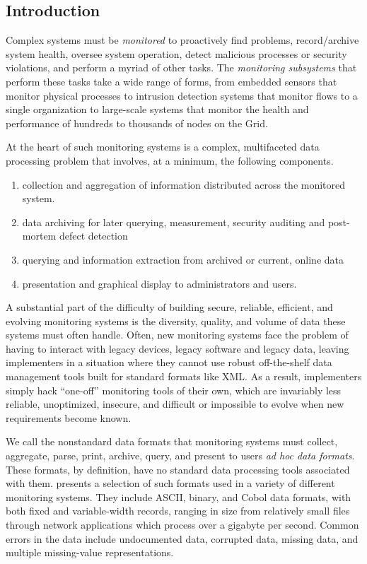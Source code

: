\subsection{Introduction}
\label{ssec:intro}

Complex systems must be {\em monitored} to proactively find problems,
record/archive system health, oversee system operation, detect
malicious processes or security violations, and perform a myriad of other tasks.
The {\em monitoring subsystems} 
that perform these tasks take a wide range of forms, 
from embedded sensors that monitor physical processes to
intrusion detection systems that monitor flows to a single
organization  
to large-scale systems
that monitor the health and performance of hundreds to thousands of nodes
on the Grid.

At the heart of such monitoring systems is a complex, multifaceted
data processing problem that involves, at a minimum, the following components.
\begin{enumerate}
\item collection and aggregation of information 
distributed across the monitored system.
\item data archiving for later querying, measurement, security auditing and 
post-mortem defect detection
\item querying and information extraction from archived or current, online data
\item presentation and graphical display to administrators and users.
\end{enumerate}

A substantial part of the difficulty of building secure, reliable, efficient,
and evolving monitoring systems is the diversity, quality, and volume of data
these systems must often handle.  Often, new monitoring
systems face the problem of having to interact with legacy devices,
legacy software and legacy data, leaving implementers in a situation
where they cannot use robust off-the-shelf data management tools built for
standard formats like XML.  As a result, implementers simply
hack ``one-off'' monitoring tools of their own, which are invariably
less reliable, unoptimized, insecure, and difficult or impossible to evolve
when new requirements become known.

We call the nonstandard data formats that monitoring systems must
collect, aggregate, parse, print, archive, query, and present to 
users {\em ad hoc data formats}.   These formats, by definition,
have no standard data processing tools associated with them.
 presents a selection of such formats
used in a variety of different monitoring systems.
They include ASCII, binary, and Cobol data formats, with
both fixed and variable-width records, ranging in size from
relatively small files through network applications which process over
a gigabyte per second.  Common errors in the data include undocumented data,
corrupted data, missing data, and multiple missing-value
representations.

